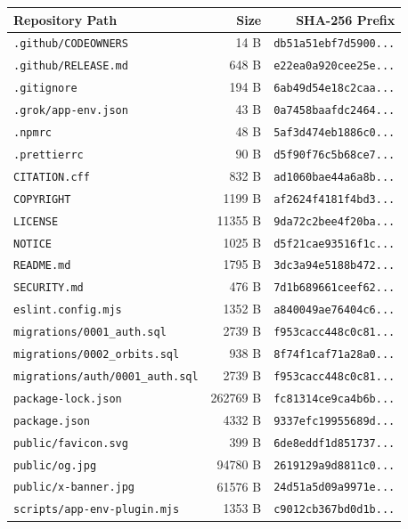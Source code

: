 \documentclass[11pt,a4paper]{article}
\begin{document}
\begin{center}
\small
\begin{tabular}{p{}rr}
\toprule
\textbf{Repository Path} & \textbf{Size} & \textbf{SHA-256 Prefix} \\
\midrule
\texttt{.github/CODEOWNERS} & 14 B & \texttt{db51a51ebf7d5900...} \\
\texttt{.github/RELEASE.md} & 648 B & \texttt{e22ea0a920cee25e...} \\
\texttt{.gitignore} & 194 B & \texttt{6ab49d54e18c2caa...} \\
\texttt{.grok/app-env.json} & 43 B & \texttt{0a7458baafdc2464...} \\
\texttt{.npmrc} & 48 B & \texttt{5af3d474eb1886c0...} \\
\texttt{.prettierrc} & 90 B & \texttt{d5f90f76c5b68ce7...} \\
\texttt{CITATION.cff} & 832 B & \texttt{ad1060bae44a6a8b...} \\
\texttt{COPYRIGHT} & 1199 B & \texttt{af2624f4181f4bd3...} \\
\texttt{LICENSE} & 11355 B & \texttt{9da72c2bee4f20ba...} \\
\texttt{NOTICE} & 1025 B & \texttt{d5f21cae93516f1c...} \\
\texttt{README.md} & 1795 B & \texttt{3dc3a94e5188b472...} \\
\texttt{SECURITY.md} & 476 B & \texttt{7d1b689661ceef62...} \\
\texttt{eslint.config.mjs} & 1352 B & \texttt{a840049ae76404c6...} \\
\texttt{migrations/0001\_auth.sql} & 2739 B & \texttt{f953cacc448c0c81...} \\
\texttt{migrations/0002\_orbits.sql} & 938 B & \texttt{8f74f1caf71a28a0...} \\
\texttt{migrations/auth/0001\_auth.sql} & 2739 B & \texttt{f953cacc448c0c81...} \\
\texttt{package-lock.json} & 262769 B & \texttt{fc81314ce9ca4b6b...} \\
\texttt{package.json} & 4332 B & \texttt{9337efc19955689d...} \\
\texttt{public/favicon.svg} & 399 B & \texttt{6de8eddf1d851737...} \\
\texttt{public/og.jpg} & 94780 B & \texttt{2619129a9d8811c0...} \\
\texttt{public/x-banner.jpg} & 61576 B & \texttt{24d51a5d09a9971e...} \\
\texttt{scripts/app-env-plugin.mjs} & 1353 B & \texttt{c9012cb367bd0d1b...} \\

\end{tabular}
\end{center}
\end{document}

